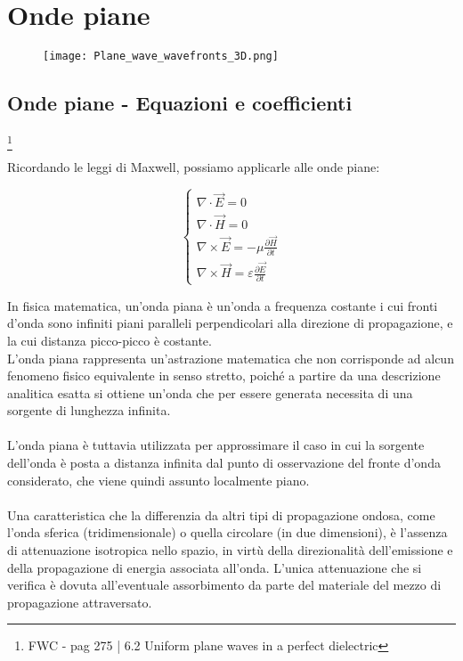 \chapter{Onde piane} 

\begin{figure}[h]
    \centering
    \texttt{[image: Plane\_wave\_wavefronts\_3D.png]}
    
\end{figure} 

\newpage 

\section{Onde piane - Equazioni e coefficienti}
\footnote{FWC - pag 275 | 6.2 Uniform plane waves in a perfect dielectric} 

Ricordando le leggi di Maxwell, possiamo applicarle alle onde piane: 

{\Large \begin{equation}
    \begin{cases}
        \nabla \cdot \vec{E} = 0 \\ 
        \nabla \cdot \vec{H} = 0 \\ 
        \nabla \times \vec{E} = -\mu \frac{\partial \vec{H}}{\partial t} \\ 
        \nabla \times \vec{H} = \varepsilon \frac{\partial \vec{E}}{\partial t}
    \end{cases}
\end{equation}} 

In fisica matematica, un'onda piana è un'onda a frequenza costante i cui fronti d'onda sono infiniti piani paralleli perpendicolari alla direzione di propagazione, e la cui distanza picco-picco è costante. \\ 

L'onda piana rappresenta un'astrazione matematica che non corrisponde ad alcun fenomeno fisico equivalente in senso stretto, poiché a partire da una descrizione analitica esatta si ottiene un'onda che per essere generata necessita di una sorgente di lunghezza infinita. \\ \\
L'onda piana è tuttavia utilizzata per approssimare il caso in cui la sorgente dell'onda è posta a distanza infinita dal punto di osservazione del fronte d'onda considerato, che viene quindi assunto localmente piano. \\ \\ 
Una caratteristica che la differenzia da altri tipi di propagazione ondosa, come l'onda sferica (tridimensionale) o quella circolare (in due dimensioni), è l'assenza di attenuazione isotropica nello spazio, in virtù della direzionalità dell'emissione e della propagazione di energia associata all'onda. L'unica attenuazione che si verifica è dovuta all'eventuale assorbimento da parte del materiale del mezzo di propagazione attraversato. 

